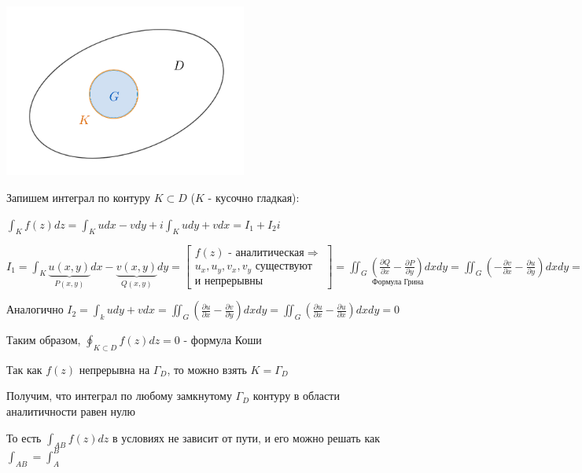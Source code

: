 \documentclass[12pt]{article}
\begin{document}
\begin{MyProof}
    \begin{center}
        \includegraphics[width=8cm]{addchapters2/images/addchapters2_2025_04_04_1}
    \end{center}

    Запишем интеграл по контуру $K \subset D$ ($K$ - кусочно гладкая):

    $\int_K f(z) dz = \int_K u dx - vdy + i \int_K u dy + v dx = I_1 + I_2 i$

    $I_1 = \int_K \underset{P(x, y)}{\underbrace{u(x, y)}} dx - \underset{Q(x, y)}{\underbrace{v(x, y)}} dy = 
    \begin{bmatrix}f(z)\text{ - аналитическая} \Longrightarrow \\ u_x, u_y, v_x, v_y \text{ существуют} \\ \text{и непрерывны}\end{bmatrix} = 
    \underset{\text{Формула Грина}}{\iint_G \left(\frac{\partial Q}{\partial x} - \frac{\partial P}{\partial y}\right) dxdy} = 
    \iint_G \left(-\frac{\partial v}{\partial x} - \frac{\partial u}{\partial y}\right) dxdy = 
    \iint_G \left(\frac{\partial u}{\partial y} - \frac{\partial u}{\partial y}\right) dxdy = 0$

    Аналогично $I_2 = \int_k udy + vdx = \iint_G \left(\frac{\partial u}{\partial x} - \frac{\partial v}{\partial y}\right) dxdy = 
    \iint_G \left(\frac{\partial u}{\partial x} - \frac{\partial u}{\partial x}\right) dxdy = 0$

    Таким образом, $\oint_{K \subset D} f(z) dz = 0$ - формула Коши

    Так как $f(z)$ непрерывна на $\Gamma_D$, то можно взять $K = \Gamma_D$
\end{MyProof}

\Nota Получим, что интеграл по любому замкнутому $\Gamma_D$ контуру в области аналитичности равен нулю

То есть $\int_{AB} f(z) dz$ в условиях  не зависит от пути, и его можно решать как $\int_{AB} = \int_A^B$
\end{document}
